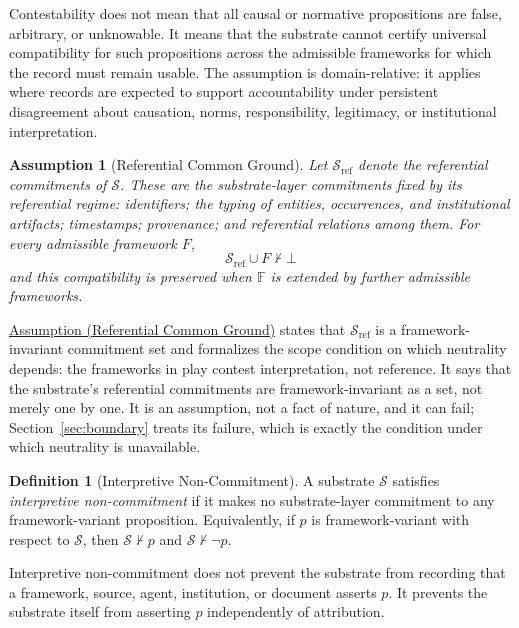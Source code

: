 \documentclass[11pt]{article}
\theoremstyle{plain}
\newtheorem{assumption}[theorem]{Assumption}
\theoremstyle{definition}
\newtheorem{definition}[theorem]{Definition}
\theoremstyle{remark}
\newcommand{\AssumpRef}[2]{\hyperref[#1]{Assumption (#2)}}
\newcommand{\SecRef}[1]{Section~\ref{#1}}
\newcommand{\Substrate}{\mathcal{S}}
\newcommand{\SubstrateRef}{\mathcal{S}_{\mathrm{ref}}}
\newcommand{\Frameworks}{\mathbb{F}}
\newcommand{\Framework}{F}
\newcommand{\notentails}{\nvdash}
\begin{document}
Contestability does not mean that all causal or normative propositions are
false, arbitrary, or unknowable.
It means that the substrate cannot certify
universal compatibility for such propositions across the admissible frameworks
for which the record must remain usable.
The assumption is domain-relative:
it applies where records are expected to support
accountability under persistent disagreement
about causation, norms, responsibility, legitimacy, or institutional interpretation.

\begin{assumption}[Referential Common Ground]
  \label{se100.def.ReferentialCommonGround}
  Let $\SubstrateRef$ denote the \emph{referential commitments} of $\Substrate$.
  These are the substrate-layer commitments fixed by its referential regime:
  identifiers;
  the typing of entities, occurrences, and institutional artifacts;
  timestamps; provenance; and referential relations among them.
  For every admissible framework $\Framework$,
  \[
    \SubstrateRef \cup \Framework \notentails \bot
  \]
  and this compatibility is preserved when $\Frameworks$ is extended by further
  admissible frameworks.
\end{assumption}

\AssumpRef{se100.def.ReferentialCommonGround}{Referential Common Ground}
states that $\SubstrateRef$ is a framework-invariant commitment set and
formalizes the scope condition on which neutrality
depends:
the frameworks in play contest interpretation, not reference.
It says that the substrate's referential commitments are framework-invariant
as a set, not merely one by one.
It is an assumption, not a fact of nature, and it can fail;
\SecRef{sec:boundary} treats its failure, which is exactly the condition under
which neutrality is unavailable.

\begin{definition}[Interpretive Non-Commitment]
  \label{se100.def.InterpretiveNonCommitment}
  A substrate $\Substrate$ satisfies \emph{interpretive non-commitment} if it
  makes no substrate-layer commitment to any framework-variant proposition.
  Equivalently, if
  $p$ is framework-variant with respect to $\Substrate$, then
  $\Substrate \notentails p$ and $\Substrate \notentails \neg p$.
\end{definition}

Interpretive non-commitment does not prevent the substrate from recording that
a framework, source, agent, institution, or document asserts $p$.
It prevents the substrate itself from asserting $p$ independently of attribution.
\end{document}
